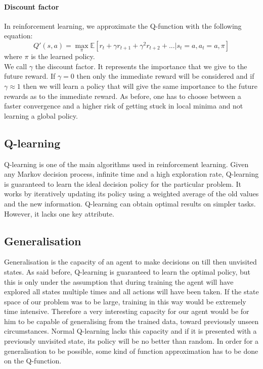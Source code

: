 \paragraph{Discount factor}
In reinforcement learning, we approximate the Q-function with the following equation:
\begin{equation}
	Q'(s,a) = \max_{\pi} \mathbb{E}[r_t+\gamma r_{t+1}+\gamma^2 r_{t+2}+...| s_t=a, a_t = a,\pi]
\end{equation}
where $\pi$ is the learned policy.\\
We call $\gamma$ the discount factor. It represents the importance that we give to the future reward. If $\gamma = 0$ then only the immediate reward will be considered and if $\gamma \approx 1$ then we will learn a policy that will give the same importance to the future rewards as to the immediate reward. As before, one has to choose between a faster convergence and a higher risk of getting stuck in local minima and not learning a global policy.
\subsection{Q-learning}
Q-learning \cite{watkins1992q} is one of the main algorithms used in reinforcement learning. Given any Markov decision process, infinite time and a high exploration rate, Q-learning is guaranteed to learn the ideal decision policy for the particular problem. It works by iteratively updating its policy using a weighted average of the old values and the new information. Q-learning can obtain optimal results on simpler tasks. However, it lacks one key attribute.
\subsection{Generalisation}
Generalisation is the capacity of an agent to make decisions on till then unvisited states. As said before, Q-learning is guaranteed to learn the optimal policy, but this is only under the assumption that during training the agent will have explored all states multiple times and all actions will have been taken. If the state space of our problem was to be large, training in this way would be extremely time intensive. Therefore a very interesting capacity for our agent would be for him to be capable of generalising from the trained data, toward previously unseen circumstances. Normal Q-learning lacks this capacity and if it is presented with a previously unvisited state, its policy will be no better than random.  In order for a generalisation to be possible, some kind of function approximation has to be done on the Q-function.
